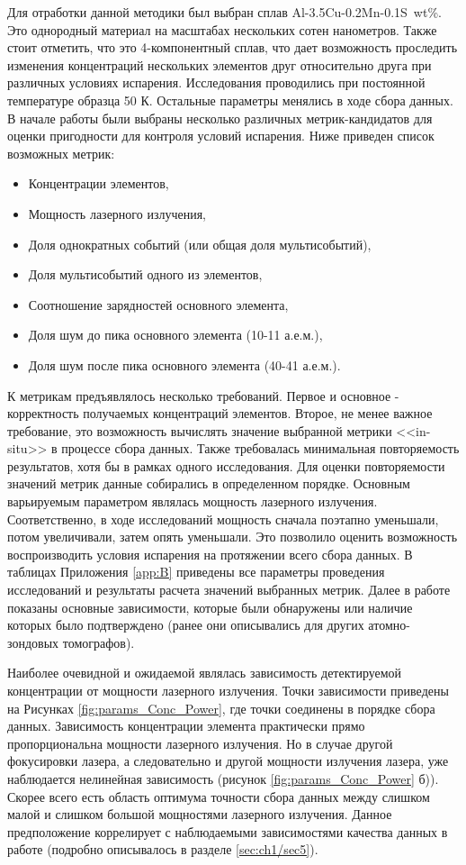 Для отработки данной методики был выбран сплав Al-3.5Cu-0.2Mn-0.1S~wt\%. Это однородный материал на масштабах нескольких сотен нанометров. Также стоит отметить, что это 4-компонентный сплав, что дает возможность проследить изменения концентраций нескольких элементов друг относительно друга при различных условиях испарения. Исследования проводились при постоянной температуре образца 50 К. Остальные параметры менялись в ходе сбора данных. В начале работы были выбраны несколько различных метрик-кандидатов для оценки пригодности для контроля условий испарения. Ниже приведен список возможных метрик:

\begin{itemize}
	\item Концентрации элементов,
	\item Мощность лазерного излучения,
	\item Доля однократных событий (или общая доля мультисобытий),
	\item Доля мультисобытий одного из элементов,
	\item Соотношение зарядностей основного элемента,
	\item Доля шум до пика основного элемента (10-11 а.е.м.),
	\item Доля шум после пика основного элемента (40-41 а.е.м.).		
\end{itemize}

К метрикам предъявлялось несколько требований. Первое и основное - корректность получаемых концентраций элементов. Второе, не менее важное требование, это возможность вычислять значение выбранной метрики <<in-situ>> в процессе сбора данных. Также требовалась минимальная повторяемость результатов, хотя бы в рамках одного исследования. Для оценки повторяемости значений метрик данные собирались в определенном порядке. Основным варьируемым параметром являлась мощность лазерного излучения. Соответственно, в ходе исследований мощность сначала поэтапно уменьшали, потом увеличивали, затем опять уменьшали. Это позволило оценить возможность воспроизводить условия испарения на протяжении всего сбора данных. В таблицах Приложения \cref{app:B} приведены все параметры проведения исследований и результаты расчета значений выбранных метрик. Далее в работе показаны основные зависимости, которые были обнаружены или наличие которых было подтверждено (ранее они описывались для других атомно-зондовых томографов).

Наиболее очевидной и ожидаемой являлась зависимость детектируемой концентрации от мощности лазерного излучения. Точки зависимости приведены на Рисунках  \cref{fig:params_Conc_Power}, где точки соединены в порядке сбора данных.  Зависимость концентрации элемента практически прямо пропорциональна мощности лазерного излучения. Но в случае другой фокусировки лазера, а следовательно и другой мощности излучения лазера, уже наблюдается нелинейная зависимость (рисунок \cref{fig:params_Conc_Power} б)). Скорее всего есть область оптимума точности сбора данных между слишком малой и слишком большой мощностями лазерного излучения. Данное предположение коррелирует с наблюдаемыми зависимостями качества данных в работе \cite{scbibOptParamsYAFI} (подробно описывалось в разделе \cref{sec:ch1/sec5}).

